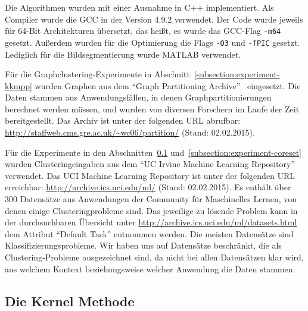 Die Algorithmen wurden mit einer Ausnahme in C++ implementiert. Als Compiler wurde die GCC in der Version 4.9.2 verwendet.
Der Code wurde jeweils für 64-Bit Architekturen übersetzt, das heißt, es wurde das GCC-Flag \texttt{-m64} gesetzt. Außerdem
wurden für die Optimierung die Flags \texttt{-O3} und \texttt{-fPIC} gesetzt. Lediglich für die Bildsegmentierung wurde
MATLAB verwendet.

Für die Graphclustering-Experimente in Abschnitt~\ref{subsection:experiment-kkmpp} wurden Graphen aus dem
"`Graph Partitioning Archive"'~\cite{SoperWC04} eingesetzt. Die Daten stammen aus Anwendungsfällen, in denen
Graphpartitionierungen berechnet werden müssen, und wurden von diversen Forschern im Laufe der Zeit bereitgestellt. Das
Archiv ist unter der folgenden URL abrufbar: \url{http://staffweb.cms.gre.ac.uk/~wc06/partition/} (Stand: 02.02.2015).

Für die Experimente in den Abschnitten~\ref{subsection:experiment-kernel-method} und~\ref{subsection:experiment-coreset}
wurden Clusteringeingaben aus dem "`UC Irvine Machine Learning Repository"'~\cite{Lichman13} verwendet.
Das UCI Machine Learning Repository
ist unter der folgenden URL erreichbar: \url{http://archive.ics.uci.edu/ml/} (Stand: 02.02.2015). Es enthält über
300 Datensätze aus Anwendungen der Community für Maschinelles Lernen, von denen einige Clusteringprobleme sind. Das jeweilige
zu lösende Problem kann in der durchsuchbaren Übersicht unter \url{http://archive.ics.uci.edu/ml/datasets.html} dem
Attribut "`Default Task"' entnommen werden. Die meisten Datensätze sind Klassifizierungsprobleme. Wir haben uns auf Datensätze
beschränkt, die als Clustering-Probleme ausgezeichnet sind, da nicht bei allen Datensätzen klar wird, aus welchem Kontext
beziehungsweise welcher Anwendung die Daten stammen.

\subsection{Die Kernel Methode}
\label{subsection:experiment-kernel-method}

